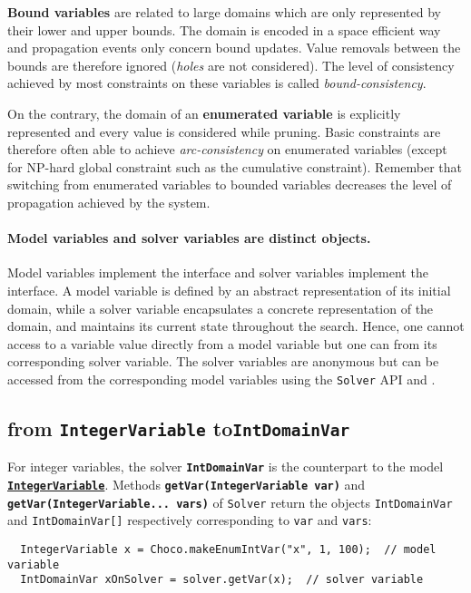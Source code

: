 \begin{note}
\textbf{Bound variables} are related to large domains which are only represented by their lower and upper bounds. The domain is encoded in a space efficient way and propagation events only concern bound updates. Value removals between the bounds are therefore ignored (\emph{holes} are not considered). The level of consistency achieved by most constraints on these variables is called \emph{bound-consistency}.

On the contrary, the domain of an \textbf{enumerated variable} is explicitly represented and every value is considered while pruning. Basic constraints are therefore often able to achieve \emph{arc-consistency} on enumerated variables (except for NP-hard global constraint such as the cumulative constraint). Remember that switching from enumerated variables to bounded variables decreases the level of propagation achieved by the system.
\end{note}


\paragraph{Model variables and solver variables are distinct objects.} 
Model variables implement the  interface and solver variables implement the  interface.
A model variable is defined by an abstract representation of its initial domain, while a solver variable encapsulates a concrete representation of the domain, and maintains its current state throughout the search.
Hence, one cannot access to a variable value directly from a model variable but one can from its corresponding solver variable. The solver variables are anonymous but can be accessed from the corresponding model variables using the \texttt{Solver} API  and .

\subsection{from \texttt{IntegerVariable} to\texttt{IntDomainVar}}\label{solver:solverandintegervariables}\hypertarget{solver:solverandintegervariables}{}

For integer variables, the solver \textbf{\tt IntDomainVar} is the counterpart to the model \hyperlink{integervariable}{\textbf{\tt IntegerVariable}}. 
Methods \textbf{\tt getVar(IntegerVariable var)} and \textbf{\tt getVar(IntegerVariable... vars)} of \texttt{Solver} return the objects \texttt{IntDomainVar} and \texttt{IntDomainVar[]} respectively corresponding to \texttt{var} and \texttt{vars}:
\begin{lstlisting}
  IntegerVariable x = Choco.makeEnumIntVar("x", 1, 100);  // model variable
  IntDomainVar xOnSolver = solver.getVar(x);  // solver variable
\end{lstlisting}

